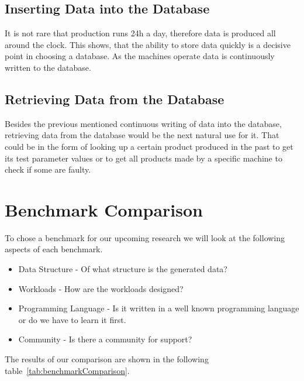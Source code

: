 \subsection{Inserting Data into the Database}
\label{ch:analysis:se:insertingData}
It is not rare that production runs 24h a day,
therefore data is produced all around the clock.
This shows,
that the ability to store data quickly is a decisive point in choosing a database.
As the machines operate data is continuously written to the database.

\subsection{Retrieving Data from the Database}
\label{ch:analysis:se:retrievingData}
Besides the previous mentioned continuous writing of data into the database,
retrieving data from the database would be the next natural use for it.
That could be in the form of looking up a certain product produced in the past to get its test parameter values or to get all products made by a specific machine to check if some are faulty.

\section{Benchmark Comparison}
\label{ch:analysis:se:benchmark}
To chose a benchmark for our upcoming research we will look at the following aspects of each benchmark.

\begin{itemize}
  \item Data Structure - Of what structure is the generated data?
  \item Workloads - How are the workloads designed?
  \item Programming Language - Is it written in a well known programming language or do we have to learn it first.
  \item Community - Is there a community for support?
\end{itemize}

The results of our comparison are shown in the following table~\ref{tab:benchmarkComparison}.

